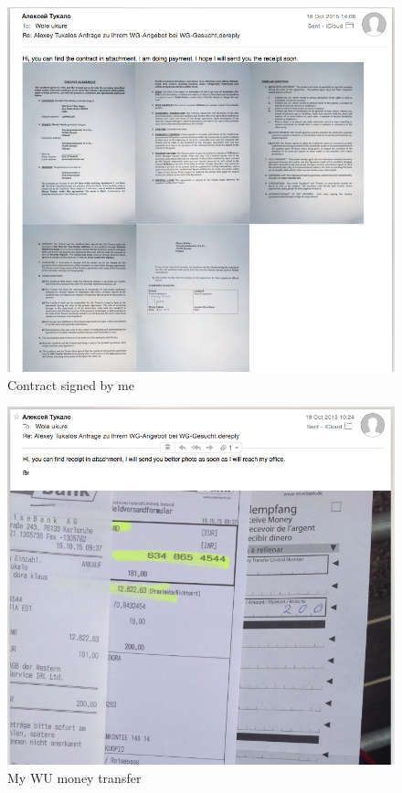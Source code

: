 \documentclass[english]{article}
\begin{document}
\begin{figure}[H]
\centerline{\includegraphics[scale=0.4]{st/3}}
\caption{Contract signed by me}
\end{figure}


\begin{figure}[H]
\centerline{\includegraphics[scale=0.4]{st/4}}
\caption{My WU money transfer}
\end{figure}
\end{document}
